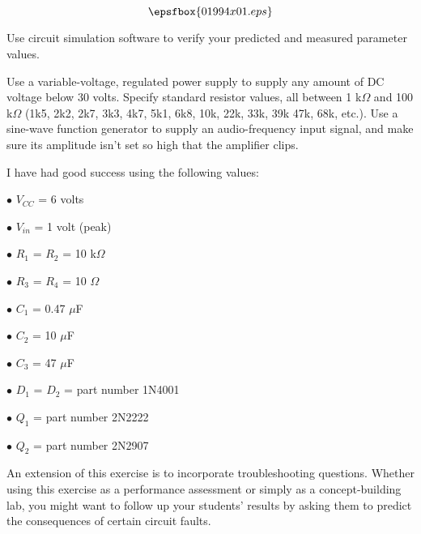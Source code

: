 

$$\epsfbox{01994x01.eps}$$

\vfil \eject






Use circuit simulation software to verify your predicted and measured parameter values.







Use a variable-voltage, regulated power supply to supply any amount of DC voltage below 30 volts.  Specify standard resistor values, all between 1 k$\Omega$ and 100 k$\Omega$ (1k5, 2k2, 2k7, 3k3, 4k7, 5k1, 6k8, 10k, 22k, 33k, 39k 47k, 68k, etc.).  Use a sine-wave function generator to supply an audio-frequency input signal, and make sure its amplitude isn't set so high that the amplifier clips.

I have had good success using the following values:

\medskip
\item{$\bullet$} $V_{CC}$ = 6 volts
\item{$\bullet$} $V_{in}$ = 1 volt (peak)
\item{$\bullet$} $R_1$ = $R_2$ = 10 k$\Omega$
\item{$\bullet$} $R_3$ = $R_4$ = 10 $\Omega$
\item{$\bullet$} $C_1$ = 0.47 $\mu$F
\item{$\bullet$} $C_2$ = 10 $\mu$F
\item{$\bullet$} $C_3$ = 47 $\mu$F
\item{$\bullet$} $D_1$ = $D_2$ = part number 1N4001
\item{$\bullet$} $Q_1$ = part number 2N2222
\item{$\bullet$} $Q_2$ = part number 2N2907
\medskip

An extension of this exercise is to incorporate troubleshooting questions.  Whether using this exercise as a performance assessment or simply as a concept-building lab, you might want to follow up your students' results by asking them to predict the consequences of certain circuit faults.




